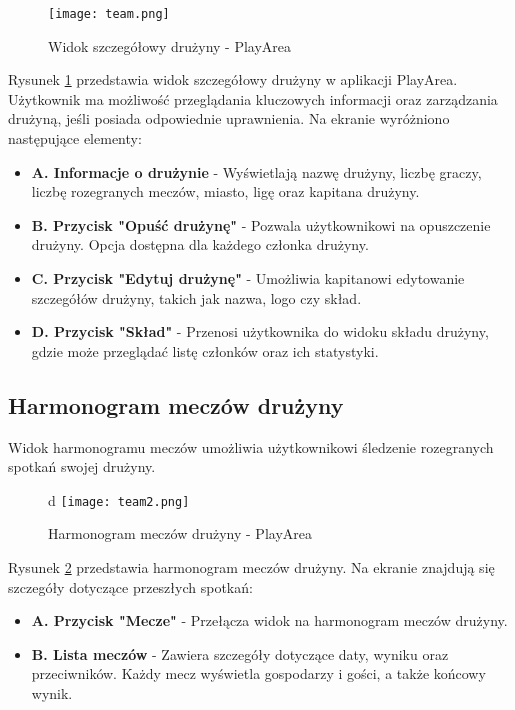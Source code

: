 \documentclass[wmii,inf,inz]{uwmthesis} %
\begin{document}
\begin{figure}[H]
    \centering
    \texttt{[image: team.png]}
    \caption{Widok szczegółowy drużyny - PlayArea}
    \label{fig:team_details}
\end{figure}

\noindent
Rysunek \ref{fig:team_details} przedstawia widok szczegółowy drużyny w aplikacji PlayArea. Użytkownik ma możliwość przeglądania kluczowych informacji oraz zarządzania drużyną, jeśli posiada odpowiednie uprawnienia. Na ekranie wyróżniono następujące elementy:
\begin{itemize}
    \item \textbf{A. Informacje o drużynie} - Wyświetlają nazwę drużyny, liczbę graczy, liczbę rozegranych meczów, miasto, ligę oraz kapitana drużyny.
    \item \textbf{B. Przycisk "Opuść drużynę"} - Pozwala użytkownikowi na opuszczenie drużyny. Opcja dostępna dla każdego członka drużyny.
    \item \textbf{C. Przycisk "Edytuj drużynę"} - Umożliwia kapitanowi edytowanie szczegółów drużyny, takich jak nazwa, logo czy skład.
    \item \textbf{D. Przycisk "Skład"} - Przenosi użytkownika do widoku składu drużyny, gdzie może przeglądać listę członków oraz ich statystyki.
\end{itemize}

\subsection{Harmonogram meczów drużyny}
Widok harmonogramu meczów umożliwia użytkownikowi śledzenie rozegranych spotkań swojej drużyny.

\begin{figure}[H]
    \centering
d    \texttt{[image: team2.png]}
    \caption{Harmonogram meczów drużyny - PlayArea}
    \label{fig:team_matches}
\end{figure}

\noindent
Rysunek \ref{fig:team_matches} przedstawia harmonogram meczów drużyny. Na ekranie znajdują się szczegóły dotyczące przeszłych spotkań:
\begin{itemize}
    \item \textbf{A. Przycisk "Mecze"} - Przełącza widok na harmonogram meczów drużyny.
    \item \textbf{B. Lista meczów} - Zawiera szczegóły dotyczące daty, wyniku oraz przeciwników. Każdy mecz wyświetla gospodarzy i gości, a także końcowy wynik.
\end{itemize}
\end{document}
